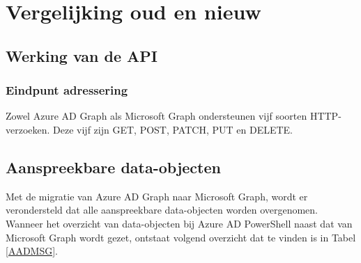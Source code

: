 
\chapter{Vergelijking oud en nieuw}%
\label{ch:vergelijking}

\section{Werking van de API}


\subsection{Eindpunt adressering}

Zowel Azure \ac{AD} Graph als Microsoft Graph ondersteunen vijf soorten \ac{HTTP}-verzoeken. Deze vijf zijn GET, POST, PATCH, PUT en DELETE.




\section{Aanspreekbare data-objecten}




Met de migratie van Azure \ac{AD} Graph naar Microsoft Graph, wordt er verondersteld dat alle aanspreekbare data-objecten worden overgenomen. Wanneer het overzicht van data-objecten bij Azure \ac{AD} PowerShell naast dat van Microsoft Graph wordt gezet, ontstaat volgend overzicht dat te vinden is in Tabel \ref{AADMSG}. \\

